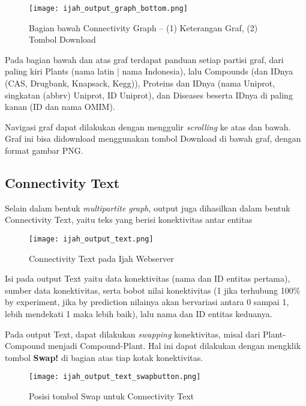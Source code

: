	\begin{figure}[H]
	\centering
	\texttt{[image: ijah\_output\_graph\_bottom.png]}
	\caption{Bagian bawah Connectivity Graph -- (1) Keterangan Graf, (2) Tombol Download}
	\label{fig:ijah_output_graph_bottom}
	\end{figure}

	Pada bagian bawah dan atas graf terdapat panduan setiap partisi graf, dari paling kiri Plants (nama latin | nama Indonesia), lalu Compounds (dan IDnya (CAS, Drugbank, Knapsack, Kegg)), Proteins dan IDnya (nama Uniprot, singkatan (abbrv) Uniprot, ID Uniprot), dan Diseases beserta IDnya di paling kanan (ID dan nama OMIM).

	Navigasi graf dapat dilakukan dengan menggulir \emph{scrolling} ke atas dan bawah. Graf ini bisa didownload menggunakan tombol Download di bawah graf, dengan format gambar PNG.
	
	\subsection{Connectivity Text} \label{text}

	Selain dalam bentuk \emph{multipartite graph}, output juga dihasilkan dalam bentuk Connectivity Text, yaitu teks yang berisi konektivitas antar entitas

	\begin{figure}[H]
	\centering
	\texttt{[image: ijah\_output\_text.png]}
	\caption{Connectivity Text pada Ijah Webserver}
	\label{fig:ijah_output_text}
	\end{figure}	
	
	Isi pada output Text yaitu data konektivitas (nama dan ID entitas pertama), sumber data konektivitas, serta bobot nilai konektivitas (1 jika terhubung 100\% by experiment, jika by prediction nilainya akan bervariasi antara 0 sampai 1, lebih mendekati 1 maka lebih baik), lalu nama dan ID entitas keduanya.

	Pada output Text, dapat dilakukan \emph{swapping} konektivitas, misal dari Plant-Compound menjadi Compound-Plant. Hal ini dapat dilakukan dengan mengklik tombol \textbf{Swap!} di bagian atas tiap kotak konektivitas.

	\begin{figure}[H]
	\centering
	\texttt{[image: ijah\_output\_text\_swapbutton.png]}
	\caption{Posisi tombol Swap untuk Connectivity Text}
	\label{fig:ijah_output_text_swapbutton}
	\end{figure}

